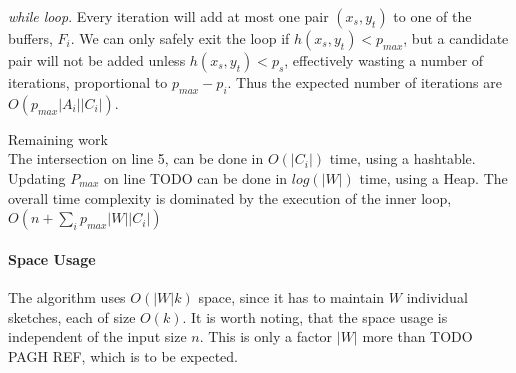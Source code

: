 \documentclass[a4paper,11pt]{article}
\begin{document}
\textit{while loop}. Every iteration will add at most one pair $(x_s, y_t)$ to one of the buffers, $F_i$. We can only safely exit the loop if $h(x_s, y_t) < p_{max}$, but a candidate pair will not be added unless $h(x_s, y_t) < p_s$, effectively wasting a number of iterations, proportional to $p_{max}-p_i$. Thus the expected number of iterations are $O(p_{max}|A_i||C_i|)$.

Remaining work\\
The intersection on line 5, can be done in $O(|C_i|)$ time, using a hashtable.
Updating $P_{max}$ on line TODO can be done in $log(|W|)$ time, using a Heap.
The overall time complexity is dominated by the execution of the inner loop, $O(n + \sum_i p_{max}|W||C_i|)$

\paragraph{Space Usage}
The algorithm uses $O(|W|k)$ space, since it has to maintain $W$ individual sketches, each of size $O(k)$. It is worth noting, that the space usage is independent of the input size $n$. This is only a factor $|W|$ more than TODO PAGH REF, which is to be expected.
\end{document}
